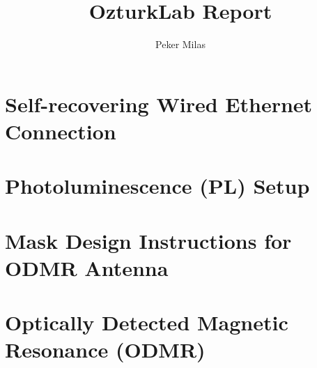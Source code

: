 \documentclass[letter,10pt,titlepage]{article}
\begin{document}
\title{OzturkLab Report}
\author{Peker Milas}
\maketitle

\tableofcontents
\newpage

\section{Self-recovering Wired Ethernet Connection}

 
\section{Photoluminescence (PL) Setup}


\section{Mask Design Instructions for ODMR Antenna}


\section{Optically Detected Magnetic Resonance (ODMR)}

\end{document}
